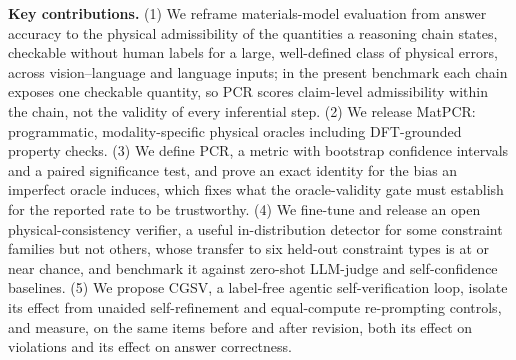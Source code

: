 \documentclass[pdflatex,sn-nature]{sn-jnl}
\newcommand{\rev}[1]{#1}
\newcommand{\rev}[1]{{\color{blue}#1}}
\begin{document}


\maketitle

\noindent\begin{tcolorbox}[colback=gray!6,colframe=gray!50,boxrule=0.5pt]
\textbf{Key contributions.} (1) We reframe materials-model evaluation from answer accuracy to the physical
\rev{admissibility of the quantities a reasoning chain states}, checkable without human labels for a large,
well-defined class of physical errors, across vision--language and language inputs\rev{; in the present benchmark each chain exposes one checkable quantity, so PCR scores claim-level admissibility within the chain, not the validity of every inferential step}. (2) We release MatPCR: programmatic,
modality-specific physical oracles including DFT-grounded property checks. (3) We
define PCR, a metric with bootstrap confidence intervals and a paired significance
test, and prove an exact identity for the bias an imperfect oracle induces, which fixes
what the oracle-validity gate must establish for the reported rate to be trustworthy.
(4) We fine-tune and release an open physical-consistency verifier, a useful
in-distribution detector \rev{for some constraint families but not others,} whose transfer to six held-out constraint types is at or near
chance,
and benchmark it against zero-shot LLM-judge and self-confidence baselines. (5) We
propose CGSV, a label-free agentic self-verification loop, isolate its effect from
unaided self-refinement and equal-compute re-prompting controls, and \rev{measure, on the same items before and after revision, both its effect on violations and its effect on answer correctness}.
\end{tcolorbox}
\end{document}
